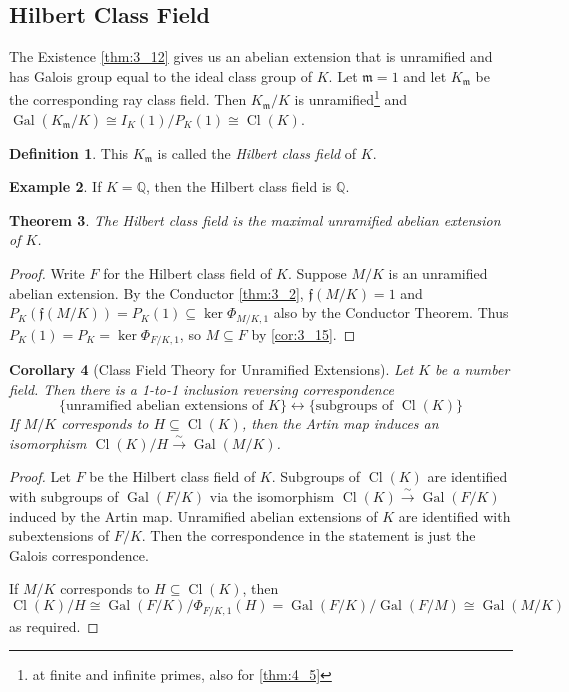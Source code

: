 \documentclass[11pt]{article}
\theoremstyle{definition}
\newtheorem{definition}{Definition}[section]
\newtheorem{example}[definition]{Example}
\theoremstyle{plain}
\newtheorem{theorem}[definition]{Theorem}
\newtheorem{corollary}[definition]{Corollary}
\theoremstyle{remark}
\DeclareMathOperator{\Gal}{Gal}
\DeclareMathOperator{\Cl}{Cl}
\newcommand{\QQ}{\mathbb{Q}}
\newcommand{\ff}{\mathfrak{f}}
\newcommand{\fm}{\mathfrak{m}}
\begin{document}
\subsection{Hilbert Class Field}

The Existence \autoref{thm:3_12} gives us an abelian extension that is unramified and has Galois group equal to the ideal class group of $K$. Let $\fm = 1$ and let $K_\fm$ be the corresponding ray class field. Then $K_\fm / K$ is unramified\footnote{at finite and infinite primes, also for \autoref{thm:4_5}} and $\Gal(K_\fm/K) \cong I_K(1) / P_K(1) \cong \Cl(K)$.


\begin{definition}\label{def:4_3}
    This $K_\fm$ is called the \emph{Hilbert class field} of $K$.
\end{definition}

\begin{example}\label{eg:4_4}
    If $K = \QQ$, then the Hilbert class field is $\QQ$.
\end{example}

\begin{theorem}\label{thm:4_5}
    The Hilbert class field is the maximal unramified abelian extension of $K$.
\end{theorem}
\begin{proof}
    Write $F$ for the Hilbert class field of $K$. Suppose $M/K$ is an unramified abelian extension. By the Conductor \autoref{thm:3_2}, $\ff(M/K) = 1$ and $P_K(\ff(M/K)) = P_K(1) \subseteq \ker \Phi_{M/K, 1}$ also by the Conductor Theorem. Thus $P_K(1) = P_K = \ker \Phi_{F/K, 1}$, so $M \subseteq F$ by \autoref{cor:3_15}.
\end{proof}

\begin{corollary}[Class Field Theory for Unramified Extensions]\label{cor:4_6}
    Let $K$ be a number field. Then there is a 1-to-1 inclusion reversing correspondence
    \begin{equation*}
        \{\text{unramified abelian extensions of } K\} \longleftrightarrow \{\text{subgroups of } \Cl(K)\}
    \end{equation*}
    If $M/K$ corresponds to $H \subseteq \Cl(K)$, then the Artin map induces an isomorphism $\Cl(K)/H \xrightarrow{\sim} \Gal(M/K)$.
\end{corollary}
{\color{blue}
\begin{proof}
    Let $F$ be the Hilbert class field of $K$. Subgroups of $\Cl(K)$ are identified with subgroups of $\Gal(F/K)$ via the isomorphism $\Cl(K) \xrightarrow{\sim} \Gal(F/K)$ induced by the Artin map. Unramified abelian extensions of $K$ are identified with subextensions of $F/K$. Then the correspondence in the statement is just the Galois correspondence.

    If $M/K$ corresponds to $H \subseteq \Cl(K)$, then
    \begin{equation*}
        \Cl(K) / H \cong \Gal(F/K) / \Phi_{F/K,1}(H) = \Gal(F/K) / \Gal(F/M) \cong \Gal(M/K)
    \end{equation*}
    as required.
\end{proof}
}
\end{document}
